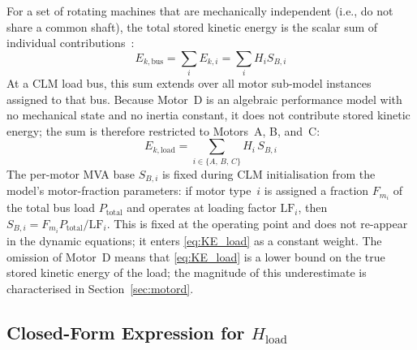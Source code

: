 \documentclass[journal]{IEEEtran}
\begin{document}
For a set of rotating machines that are mechanically independent (i.e., do not share a common shaft), the total stored kinetic energy is the scalar sum of individual contributions~\cite{Kundur1994}:
\begin{equation}
    E_{k,\mathrm{bus}} = \sum_{i} E_{k,i} = \sum_{i} H_i S_{B,i}
    \label{eq:KE_sum}
\end{equation}
At a CLM load bus, this sum extends over all motor sub-model instances assigned to that bus. Because Motor~D is an algebraic performance model with no mechanical state and no inertia constant, it does not contribute stored kinetic energy; the sum is therefore restricted to Motors~A, B, and~C:
\begin{equation}
    E_{k,\mathrm{load}} = \sum_{i \in \{A,\,B,\,C\}} H_i\, S_{B,i}
    \label{eq:KE_load}
\end{equation}
The per-motor MVA base $S_{B,i}$ is fixed during CLM initialisation from the model's motor-fraction parameters: if motor type~$i$ is assigned a fraction $F_{m_i}$ of the total bus load $P_{\mathrm{total}}$ and operates at loading factor $\mathrm{LF}_i$, then $S_{B,i} = F_{m_i} P_{\mathrm{total}} / \mathrm{LF}_i$. This is fixed at the operating point and does not re-appear in the dynamic equations; it enters \eqref{eq:KE_load} as a constant weight. The omission of Motor~D means that \eqref{eq:KE_load} is a lower bound on the true stored kinetic energy of the load; the magnitude of this underestimate is characterised in Section~\ref{sec:motord}.

\subsection{Closed-Form Expression for \texorpdfstring{$H_{\mathrm{load}}$}{H\_load}}
\end{document}
